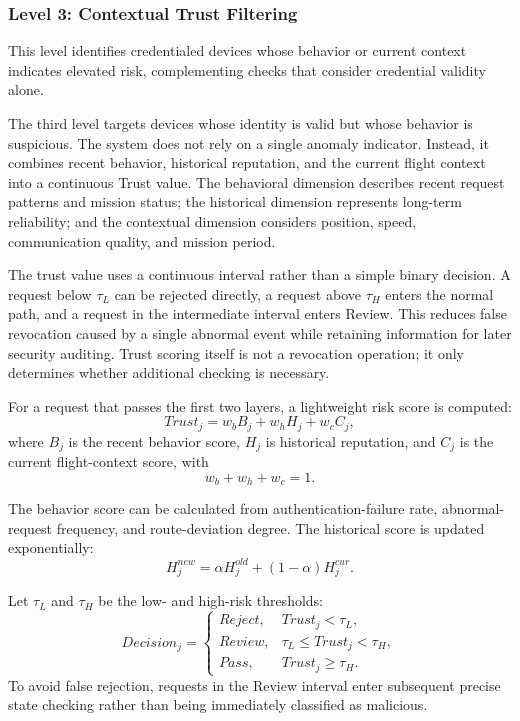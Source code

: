\documentclass[lettersize,journal]{IEEEtran}
\begin{document}
	\subsubsection{Level 3: Contextual Trust Filtering}
	This level identifies credentialed devices whose behavior or current context indicates elevated risk, complementing checks that consider credential validity alone.
	
	
	The third level targets devices whose identity is valid but whose behavior is suspicious. The system does not rely on a single anomaly indicator. Instead, it combines recent behavior, historical reputation, and the current flight context into a continuous Trust value. The behavioral dimension describes recent request patterns and mission status; the historical dimension represents long-term reliability; and the contextual dimension considers position, speed, communication quality, and mission period.
	
	The trust value uses a continuous interval rather than a simple binary decision. A request below $\tau_L$ can be rejected directly, a request above $\tau_H$ enters the normal path, and a request in the intermediate interval enters Review. This reduces false revocation caused by a single abnormal event while retaining information for later security auditing. Trust scoring itself is not a revocation operation; it only determines whether additional checking is necessary.
	
	For a request that passes the first two layers, a lightweight risk score is computed:
	\begin{equation}
		Trust_j=w_bB_j+w_hH_j+w_cC_j,
	\end{equation}
	where $B_j$ is the recent behavior score, $H_j$ is historical reputation, and $C_j$ is the current flight-context score, with
	\begin{equation}
		w_b+w_h+w_c=1.
	\end{equation}
	
	The behavior score can be calculated from authentication-failure rate, abnormal-request frequency, and route-deviation degree. The historical score is updated exponentially:
	\begin{equation}
		H_j^{new}=\alpha H_j^{old}+(1-\alpha)H_j^{cur}.
	\end{equation}
	
	Let $\tau_L$ and $\tau_H$ be the low- and high-risk thresholds:
	\begin{equation}
		Decision_j=
		\begin{cases}
			Reject,&Trust_j<\tau_L,\\
			Review,&\tau_L\le Trust_j<\tau_H,\\
			Pass,&Trust_j\ge\tau_H.
		\end{cases}
	\end{equation}
	To avoid false rejection, requests in the Review interval enter subsequent precise state checking rather than being immediately classified as malicious.
	
\end{document}
